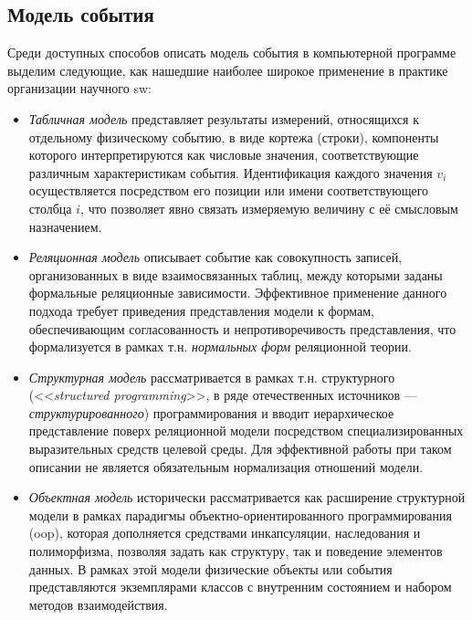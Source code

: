 \subsection{Модель события}

Среди доступных способов описать модель события в компьютерной программе выделим
следующие, как нашедшие наиболее широкое применение в практике организации
научного \acrshort{sw}:

\begin{itemize}
    \item \emph{Табличная модель}
    представляет результаты измерений, относящихся к отдельному физическому событию, в виде
    кортежа (строки), компоненты которого интерпретируются как числовые значения,
    соответствующие различным характеристикам события. Идентификация каждого значения
    $v_i$ осуществляется посредством его позиции или имени соответствующего
    столбца $i$, что позволяет явно связать измеряемую величину с её смысловым
    назначением.
    \item \emph{Реляционная модель}
    описывает событие как совокупность записей, организованных
    в виде взаимосвязанных таблиц, между которыми заданы формальные
    реляционные зависимости. Эффективное применение данного подхода требует
    приведения представления модели к формам,
    обеспечивающим согласованность и непротиворечивость представления,
    что формализуется в рамках т.н. \emph{нормальных форм} реляционной теории.
    \item \emph{Структурная модель} рассматривается в рамках
    т.н. структурного (<<\emph{structured programming}>>, в
    ряде отечественных источников --- \emph{структурированного})
    программирования и вводит иерархическое представление
    поверх реляционной модели посредством специализированных
    выразительных средств целевой среды. Для эффективной
    работы при таком описании не является обязательным
    нормализация отношений модели.
    \item \emph{Объектная модель} исторически рассматривается как
    расширение структурной модели в рамках парадигмы объектно-ориентированного
    программирования (\acrshort{oop}), которая дополняется средствами инкапсуляции,
    наследования и полиморфизма, позволяя задать как структуру,
    так и поведение элементов данных. В рамках этой модели
    физические объекты или события представляются экземплярами
    классов с внутренним состоянием и набором методов взаимодействия.
\end{itemize}

